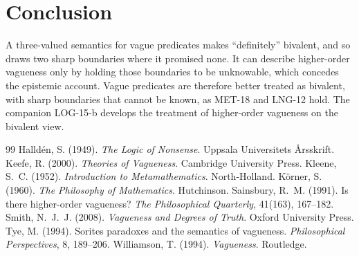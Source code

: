 \documentclass{situationist-preprint}
\begin{document}
\section{Conclusion}

A three-valued semantics for vague predicates makes \enquote{definitely} bivalent, and so draws two sharp boundaries where it promised none. It can describe higher-order vagueness only by holding those boundaries to be unknowable, which concedes the epistemic account. Vague predicates are therefore better treated as bivalent, with sharp boundaries that cannot be known, as MET-18 and LNG-12 hold. The companion LOG-15-b develops the treatment of higher-order vagueness on the bivalent view.

\begin{thebibliography}{99}\small
{} Halldén, S. (1949). \emph{The Logic of Nonsense}. Uppsala Universitets Årsskrift.
 Keefe, R. (2000). \emph{Theories of Vagueness}. Cambridge University Press.
 Kleene, S.~C. (1952). \emph{Introduction to Metamathematics}. North-Holland.
 Körner, S. (1960). \emph{The Philosophy of Mathematics}. Hutchinson.
 Sainsbury, R.~M. (1991). Is there higher-order vagueness? \emph{The Philosophical Quarterly}, 41(163), 167--182.
 Smith, N.~J.~J. (2008). \emph{Vagueness and Degrees of Truth}. Oxford University Press.
 Tye, M. (1994). Sorites paradoxes and the semantics of vagueness. \emph{Philosophical Perspectives}, 8, 189--206.
 Williamson, T. (1994). \emph{Vagueness}. Routledge.
\end{thebibliography}
\end{document}
